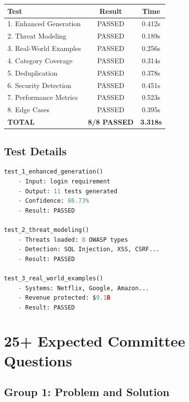 \documentclass[12pt,a4paper]{report}
\begin{document}
\begin{table}[h]
\centering
\begin{tabular}{|l|c|c|}
\hline
\textbf{Test} & \textbf{Result} & \textbf{Time} \\
\hline
1. Enhanced Generation & PASSED & 0.412s \\
2. Threat Modeling & PASSED & 0.189s \\
3. Real-World Examples & PASSED & 0.256s \\
4. Category Coverage & PASSED & 0.314s \\
5. Deduplication & PASSED & 0.378s \\
6. Security Detection & PASSED & 0.451s \\
7. Performance Metrics & PASSED & 0.523s \\
8. Edge Cases & PASSED & 0.395s \\
\hline
\textbf{TOTAL} & \textbf{8/8 PASSED} & \textbf{3.318s} \\
\hline
\end{tabular}
\end{table}

\section{Test Details}

\begin{lstlisting}[language=Python, caption=Test execution]
test_1_enhanced_generation()
    - Input: login requirement
    - Output: 11 tests generated
    - Confidence: 86.73%
    - Result: PASSED

test_2_threat_modeling()
    - Threats loaded: 8 OWASP types
    - Detection: SQL Injection, XSS, CSRF...
    - Result: PASSED

test_3_real_world_examples()
    - Systems: Netflix, Google, Amazon...
    - Revenue protected: $9.1B
    - Result: PASSED
\end{lstlisting}

\chapter{25+ Expected Committee Questions}

\section{Group 1: Problem and Solution}
\end{document}
